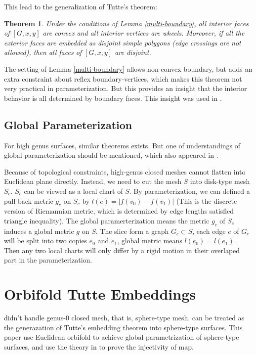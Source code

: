 \documentclass[fleqn,10pt]{wlscirep}
\newtheorem{theorem}{Theorem}[section]
\begin{document}
This lead to the generalization of Tutte's theorem:
\begin{theorem}
Under the conditions of Lemma \ref{multi-boundary}, all interior faces of $[G,x,y]$ are convex and all interior vertices are wheels. Moreover, if all the exterior faces are embedded as disjoint simple polygons (edge crossings are not allowed), then all faces of $[G, x, y]$ are disjoint.
\end{theorem}

The setting of Lemma \ref{multi-boundary} allows non-convex boundary, but adds an extra constraint about reflex boundary-vertices, which makes this theorem not very practical in parameterization. But this provides an insight that the interior behavior is all determined by boundary faces. This insight was used in \cite{Bright:2017:HGP:3072959.3073646}.

\subsection{Global Parameterization}

For high genus surfaces, similar theorems exists. But one of understandings of global parameterization should be mentioned, which also appeared in \cite{Aigerman:2015:OTE:2816795.2818099}\cite{Bright:2017:HGP:3072959.3073646} \cite{1704.06873}.

Because of topological constraints, high-genus closed meshes cannot flatten into Euclidean plane directly. Instead, we need to cut the mesh $S$ into disk-type mesh $S_c$. $S_c$ can be viewed as a local chart of $S$. By parameterization, we can defined a pull-back metric $g_c$ on $S_c$ by $l(e) = |f(v_0) - f(v_1)|$ (This is the discrete version of Riemannian metric, which is determined by edge lengths satisfied triangle inequality). The global paramerterization means the metric $g_c$ of $S_c$ induces a global metric $g$ on $S$. The slice form a graph $G_c\subset S$, each edge $e$ of $G_c$ will be split into two copies $e_0$ and $e_1$, global metric means $l(e_0) = l(e_1)$. Then any two local charts will only differ by a rigid motion in their overlaped part in the parameterization.

\section{Orbifold Tutte Embeddings}
\cite{Gortler:2006:DOM:1133946.1648437} didn't handle genus-0 closed mesh, that is, sphere-type mesh.
\cite{Aigerman:2015:OTE:2816795.2818099} can be treated as the generazation of Tutte's embedding theorem into sphere-type surfaces. This paper use Euclidean orbifold to achieve global parametrization of sphere-type surfaces, and use the theory in \cite{Gortler:2006:DOM:1133946.1648437} to prove the injectivity of map.
\end{document}
